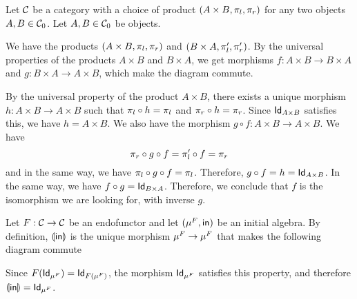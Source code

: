 \begin{solution}\label{sol:swap_binary_product}
  Let $\CC$ be a category with a choice of product $(A\times B, \projl, \projr)$ for any two objects $A,B\in \Ob{\CC}$. Let $A, B \in \Ob\CC$ be objects.

	\begin{center}
	\end{center}

	We have the products $ (A \times B, \projl, \projr) $ and $ (B \times A, \projl^\prime, \projr^\prime) $. By the universal properties of the products $ A \times B $ and $ B \times A $, we get morphisms $ f: A \times B \to B \times A $ and $ g: B \times A \to A \times B $, which make the diagram commute.
	
	By the universal property of the product $ A \times B $, there exists a unique morphism $ h: A \times B \to A \times B $ such that $ \projl \circ h = \projl $ and $ \projr \circ h = \projr $. Since $ \Id[A \times B] $ satisfies this, we have $ h = A \times B $. We also have the morphism $ g \circ f: A \times B \to A \times B $. We have
	\[ \projr \circ g \circ f = \projl^\prime \circ f = \projr \]
	and in the same way, we have $ \projl \circ g \circ f = \projl $. Therefore, $ g \circ f = h = \Id[A \times B] $. In the same way, we have $ f \circ g = \Id[B \times A] $. Therefore, we conclude that $ f $ is the isomorphism we are looking for, with inverse $ g $.
\end{solution}

\begin{solution}\label{sol:in_catamorphism_id}
	Let $ F: \CC \to \CC $ be an endofunctor and let $ (\Initalg F, \In) $ be an initial algebra. By definition, $ \catam{\In} $ is the unique morphism $ \Initalg F \to \Initalg F $ that makes the following diagram commute
	\begin{center}
	\end{center}
	Since $ F(\Id[\Initalg F]) = \Id[F(\Initalg F)] $, the morphism $ \Id[\Initalg F] $ satisfies this property, and therefore $ \catam{\In} = \Id[\Initalg F] $.
\end{solution}

